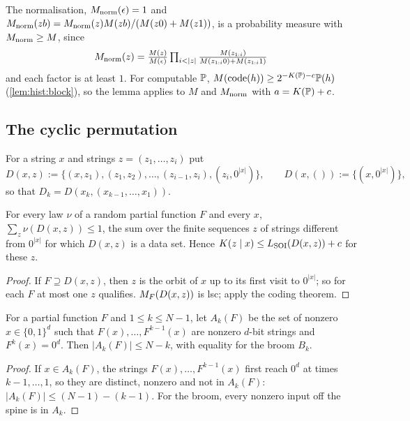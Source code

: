 The normalisation, $M_{\mathrm{norm}}(\epsilon)=1$ and $M_{\mathrm{norm}}(zb)=M_{\mathrm{norm}}(z)M(zb)/(M(z0)+M(z1))$, is a probability measure with $M_{\mathrm{norm}}\ge M$, since
\[\textstyle\Mnorm(z)=\frac{M(z)}{M(\epsilon)}\prod_{i<|z|}\frac{M(z_{1:i})}{M(z_{1:i}0)+M(z_{1:i}1)}\]
and each factor is at least $1$. For computable $\mathbb{P}$, $M(\operatorname{code}(h))\ge2^{-K(\mathbb{P})-c}\mathbb{P}(h)$ (\cref{lem:hist:block}), so the lemma applies to $M$ and $M_{\mathrm{norm}}$ with $a=K(\mathbb{P})+c$.

\subsection{The cyclic permutation}\label{app:ex:cyclic}

For a string $x$ and strings $z=(z_1,\dots,z_i)$ put
\[D(x,z):=\{(x,z_1),(z_1,z_2),\dots,(z_{i-1},z_i),(z_i,0^{|x|})\},\qquad D(x,()):=\{(x,0^{|x|})\},\]
so that $D_k=D(x_k,(x_{k-1},\dots,x_1))$.

\begin{lemma}\label{lem:ex:chainsemi}
For every law $\nu$ of a random partial function $F$ and every $x$, $\sum_z\nu(D(x,z))\le1$, the sum over the finite sequences $z$ of strings different from $0^{|x|}$ for which $D(x,z)$ is a data set. Hence $K(z\mid x)\le L_{\mathrm{SOI}}(D(x,z))+c$ for these $z$.
\end{lemma}

\begin{proof}
If $F\supseteq D(x,z)$, then $z$ is the orbit of $x$ up to its first visit to $0^{|x|}$; so for each $F$ at most one $z$ qualifies. $M_{F}(D(x,z))$ is lsc; apply the coding theorem.
\end{proof}

\begin{lemma}\label{lem:ex:depth}
For a partial function $F$ and $1\le k\le N-1$, let $A_k(F)$ be the set of nonzero $x\in\{0,1\}^d$ such that $F(x),\dots,F^{k-1}(x)$ are nonzero $d$-bit strings and $F^k(x)=0^d$. Then $|A_k(F)|\le N-k$, with equality for the broom $B_k$.
\end{lemma}

\begin{proof}
If $x\in A_k(F)$, the strings $F(x),\dots,F^{k-1}(x)$ first reach $0^d$ at times $k-1,\dots,1$, so they are distinct, nonzero and not in $A_k(F)$: $|A_k(F)|\le(N-1)-(k-1)$. For the broom, every nonzero input off the spine is in $A_k$.
\end{proof}


